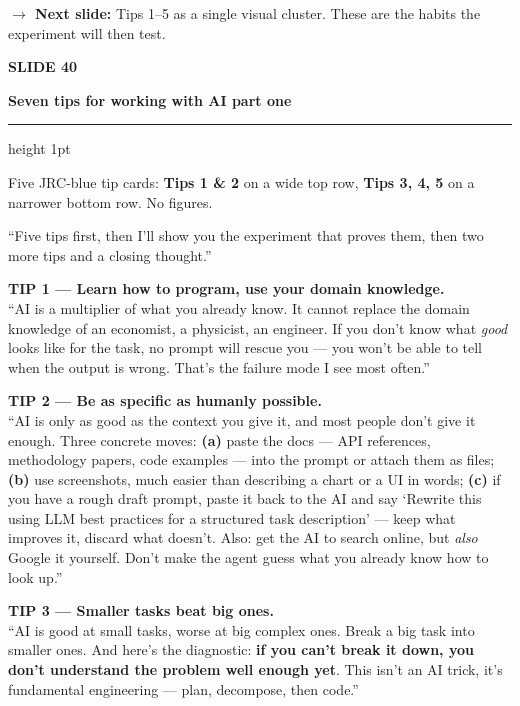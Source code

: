 \documentclass[11pt,a4paper]{article}
\newcommand{\slidehead}[2]{%
  \vspace{2pt}%
  {\small\color{mutedgrey}\textbf{SLIDE #1}}\par
  {\LARGE\color{jrcblue}\bfseries #2}\par
  \vspace{6pt}%
  {\color{jrcblue}\hrule height 1pt}%
  \vspace{8pt}%
}
\newcommand{\block}[1]{\par\vspace{4pt}{\small\color{jrcblue}\textbf{\MakeUppercase{#1}}}\par\vspace{2pt}}
\newenvironment{sayblock}{%
  \begin{tcolorbox}[colback=cardbg, colframe=jrcblue, boxrule=0.8pt, arc=2pt,
                    left=10pt, right=10pt, top=6pt, bottom=6pt, fontupper=\normalsize,
                    title={\bfseries Say this}, coltitle=white, colbacktitle=jrcblue,
                    fonttitle=\small\bfseries]
}{%
  \end{tcolorbox}
}
\newcommand{\transition}[1]{%
  \par\vspace{4pt}%
  \begin{tcolorbox}[colback=white, colframe=mutedgrey!40, boxrule=0.5pt, arc=2pt,
                    left=10pt, right=10pt, top=4pt, bottom=4pt, fontupper=\small]
    {\color{mutedgrey}\textbf{\textsf{$\to$ Next slide:}}} #1
  \end{tcolorbox}
}
\begin{document}
\transition{Tips 1–5 as a single visual cluster. These are the habits the
experiment will then test.}

\newpage

\slidehead{40}{Seven tips for working with AI \textendash{} part one}

\block{On screen}
Five JRC-blue tip cards: \textbf{Tips 1 \& 2} on a wide top row,
\textbf{Tips 3, 4, 5} on a narrower bottom row. No figures.

\begin{sayblock}
``Five tips first, then I'll show you the experiment that proves them, then two
more tips and a closing thought.''\par\vspace{6pt}

\textbf{TIP 1 — Learn how to program, use your domain knowledge.}\\
``AI is a multiplier of what you already know. It cannot replace the domain
knowledge of an economist, a physicist, an engineer. If you don't know what
\emph{good} looks like for the task, no prompt will rescue you — you won't be
able to tell when the output is wrong. That's the failure mode I see most
often.''\par\vspace{4pt}

\textbf{TIP 2 — Be as specific as humanly possible.}\\
``AI is only as good as the context you give it, and most people don't give it
enough. Three concrete moves: \textbf{(a)} paste the docs — API references,
methodology papers, code examples — into the prompt or attach them as files;
\textbf{(b)} use screenshots, much easier than describing a chart or a UI in
words; \textbf{(c)} if you have a rough draft prompt, paste it back to the AI
and say `Rewrite this using LLM best practices for a structured task
description' — keep what improves it, discard what doesn't. Also: get the AI
to search online, but \emph{also} Google it yourself. Don't make the agent
guess what you already know how to look up.''\par\vspace{4pt}

\textbf{TIP 3 — Smaller tasks beat big ones.}\\
``AI is good at small tasks, worse at big complex ones. Break a big task into
smaller ones. And here's the diagnostic: \textbf{if you can't break it down,
you don't understand the problem well enough yet}. This isn't an AI trick,
it's fundamental engineering — plan, decompose, then code.''\par\vspace{4pt}


\end{sayblock}
\end{document}
